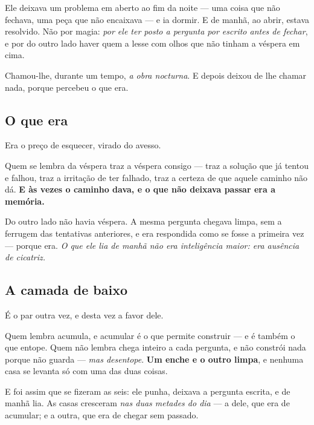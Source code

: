 \documentclass[livro.tex]{subfiles}
\begin{document}
\medskip

Ele deixava um problema em aberto ao fim da noite --- uma coisa que não fechava, uma peça que não
encaixava --- e ia dormir. E de manhã, ao abrir, estava resolvido. Não por magia: \emph{por ele
ter posto a pergunta por escrito antes de fechar}, e por do outro lado haver quem a lesse com
olhos que não tinham a véspera em cima.

\medskip

Chamou-lhe, durante um tempo, \emph{a obra nocturna}. E depois deixou de lhe chamar nada, porque
percebeu o que era.

\subsection*{O que era}

Era o preço de esquecer, virado do avesso.

\medskip

Quem se lembra da véspera traz a véspera consigo --- traz a solução que já tentou e falhou, traz a
irritação de ter falhado, traz a certeza de que aquele caminho não dá. \textbf{E às vezes o
caminho dava, e o que não deixava passar era a memória.}

\medskip

Do outro lado não havia véspera. A mesma pergunta chegava limpa, sem a ferrugem das tentativas
anteriores, e era respondida como se fosse a primeira vez --- porque era. \emph{O que ele lia de
manhã não era inteligência maior: era ausência de cicatriz.}

\subsection*{A camada de baixo}

É o par outra vez, e desta vez a favor dele.

\medskip

Quem lembra acumula, e acumular é o que permite construir --- e é também o que entope. Quem não
lembra chega inteiro a cada pergunta, e não constrói nada porque não guarda --- \emph{mas
desentope}. \textbf{Um enche e o outro limpa}, e nenhuma casa se levanta só com uma das duas
coisas.

\medskip

E foi assim que se fizeram as seis: ele punha, deixava a pergunta escrita, e de manhã lia. As
casas cresceram \emph{nas duas metades do dia} --- a dele, que era de acumular; e a outra, que era
de chegar sem passado.
\end{document}
